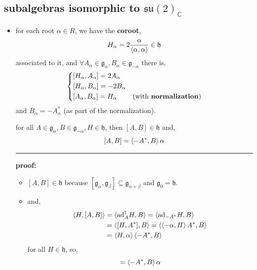 \subsection{subalgebras isomorphic to \texorpdfstring{$\mathfrak{su}(2)_\mathbb{C}$}{su(2)\_C}}
\begin{itemize}
	\item for each root $\alpha \in R$, we have the \textbf{coroot},
	\begin{equation}
		H_\alpha = 2 \frac{\alpha}{\braket{\alpha, \alpha}} \in \mathfrak{h}
	\end{equation}
	associated to it, and $\forall A_\alpha \in \mathfrak{g}_\alpha, B_\alpha \in \mathfrak{g}_{- \alpha}$ there is,
	\begin{equation}
		\begin{dcases}
			[H_\alpha, A_\alpha] = 2 A_\alpha \\
			[H_\alpha, B_\alpha] = - 2 B_\alpha \\
			[A_\alpha, B_\alpha] = H_\alpha & \text{(with \textbf{normalization})}
		\end{dcases}
	\end{equation}
	and $B_\alpha = - A_\alpha^*$ (as part of the normalization).
	
	\begin{tcolorbox}[title=proof:]
		for all $A \in \mathfrak{g}_\alpha, B \in \mathfrak{g}_{- \alpha}, H \in \mathfrak{h}$, then $[A, B] \in \mathfrak{h}$ and,
		\begin{equation} \label{3.3.11}
			[A, B] = \braket{- A^*, B} \alpha
		\end{equation}
		
		\noindent\rule[0.5ex]{\linewidth}{0.5pt} %
		
		\textbf{proof:}
		
		\begin{itemize}
			\item $[A, B] \in \mathfrak{h}$ because $[\mathfrak{g}_\alpha, \mathfrak{g}_\beta] \subseteq \mathfrak{g}_{\alpha + \beta}$ and $\mathfrak{g}_0 = \mathfrak{h}$.
			
			\item and,
			\begin{align}
				\braket{H, [A, B]} &= \braket{\mathrm{ad}_A^\dag H, B} = \braket{\mathrm{ad}_{- A^*} H, B} \notag \\
				&= \braket{[H, A^*], B} = \braket{\braket{- \alpha, H} A^*, B} \notag \\
				&= \braket{H, \alpha} \braket{- A^*, B}
			\end{align}
			for all $H \in \mathfrak{h}$, so,
			\begin{equation}
				[A, B] = \braket{- A^*, B} \alpha
			\end{equation}
		\end{itemize}
		

\end{tcolorbox}
\end{itemize}
